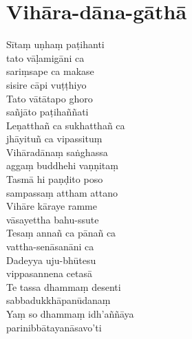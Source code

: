 \section{Vihāra-dāna-gāthā}

\begin{paritta}
  Sītaṃ uṇhaṃ paṭihanti\\\vin tato vāḷamigāni ca\\
  sariṃsape ca makase\\\vin sisire cāpi vuṭṭhiyo\\
  Tato vātātapo ghoro\\\vin sañjāto paṭihaññati\\
  Leṇatthañ ca sukhatthañ ca\\\vin jhāyituñ ca vipassituṃ\\
  Vihāradānaṃ saṅghassa\\\vin aggaṃ buddhehi vaṇṇitaṃ\\
  Tasmā hi paṇḍito poso\\\vin sampassaṃ attham attano\\
  Vihāre kāraye ramme\\\vin vāsayettha bahu-ssute\\
  Tesaṃ annañ ca pānañ ca\\\vin vattha-senāsanāni ca\\
  Dadeyya uju-bhūtesu\\\vin vippasannena cetasā\\
  Te tassa dhammaṃ desenti\\\vin sabbadukkhāpanūdanaṃ\\
  Yaṃ so dhammaṃ idh'aññāya\\\vin parinibbātayanāsavo'ti
\end{paritta}


